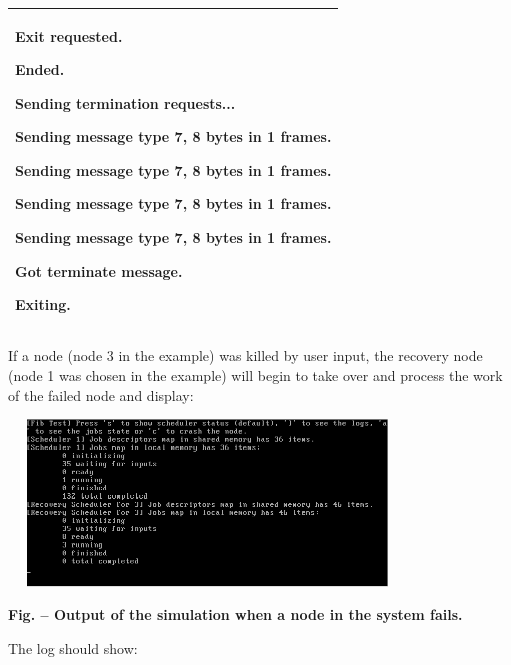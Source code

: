 \documentclass[a4paper]{article}
\newcounter{Figure}
\renewcommand\theFigure{\arabic{Figure}}
\begin{document}
\begin{flushleft}
\begin{supertabular}{|m{6.4018598in}|}
{ Exit requested.}

{\ttfamily [Job 10010000000200] Ended.}

{\ttfamily [Scheduler 1] Sending termination
requests...}

{ Sending message type
7, 8 bytes in 1 frames.}

{ Sending message type
7, 8 bytes in 1 frames.}

{ Sending message type
7, 8 bytes in 1 frames.}

{ Sending message type
7, 8 bytes in 1 frames.}

{ Got
terminate message.}

\ttfamily [Scheduler 1] Exiting.\\\hline
\end{supertabular}
\end{flushleft}
{
If a node (node 3 in the example) was killed by user input, the recovery
node (node 1 was chosen in the example) will begin to take over and
process the work of the failed node and display:}

{\centering 
\includegraphics[width=4.1555in,height=1.7453in]{img48.png}
\par}

{\centering{}\sffamily\bfseries
Fig.
\stepcounter{Figure}{\theFigure} -- Output of the simulation when a
node in the system fails.
\par}

{
The log should show:}
\end{document}

